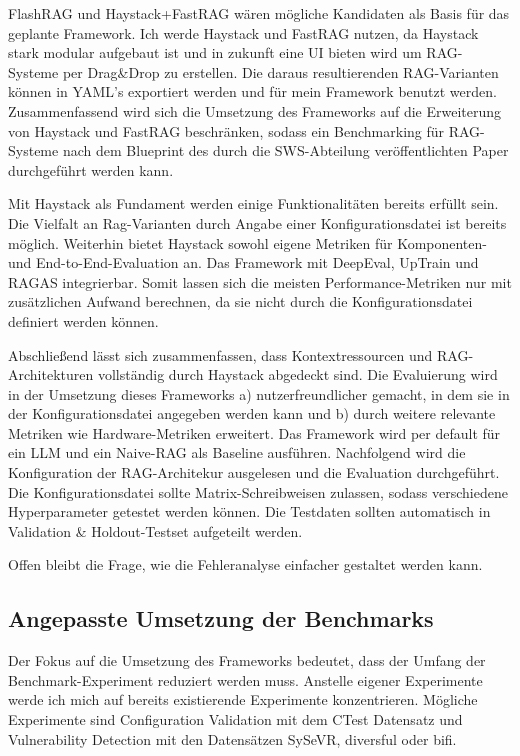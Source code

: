 \documentclass[letterpaper, 10 pt, conference]{ieeeconf}
\begin{document}
FlashRAG und Haystack+FastRAG wären mögliche Kandidaten als Basis für das geplante Framework. 
Ich werde Haystack und FastRAG nutzen, da Haystack stark modular aufgebaut ist und in zukunft eine UI bieten wird um RAG-Systeme per Drag\&Drop zu erstellen. 
Die daraus resultierenden RAG-Varianten können in YAML's exportiert werden und für mein Framework benutzt werden.\\

Zusammenfassend wird sich die Umsetzung des Frameworks auf die Erweiterung von Haystack und FastRAG beschränken, sodass ein Benchmarking für RAG-Systeme nach dem Blueprint des durch die SWS-Abteilung veröffentlichten Paper durchgeführt werden kann.

Mit Haystack als Fundament werden einige Funktionalitäten bereits erfüllt sein. Die Vielfalt an Rag-Varianten durch Angabe einer Konfigurationsdatei ist bereits möglich.
Weiterhin bietet Haystack sowohl eigene Metriken für Komponenten- und End-to-End-Evaluation an. 
Das Framework mit DeepEval, UpTrain und RAGAS integrierbar. Somit lassen sich die meisten Performance-Metriken nur mit zusätzlichen Aufwand berechnen, da sie nicht durch die Konfigurationsdatei definiert werden können.

Abschließend lässt sich zusammenfassen, dass Kontextressourcen und RAG-Architekturen vollständig durch Haystack abgedeckt sind. 
Die Evaluierung wird in der Umsetzung dieses Frameworks a) nutzerfreundlicher gemacht, in dem sie in der Konfigurationsdatei angegeben werden kann und b) durch weitere relevante Metriken wie Hardware-Metriken erweitert.
Das Framework wird per default für ein LLM und ein Naive-RAG als Baseline ausführen. Nachfolgend wird die Konfiguration der RAG-Architekur ausgelesen und die Evaluation durchgeführt.
Die Konfigurationsdatei sollte Matrix-Schreibweisen zulassen, sodass verschiedene Hyperparameter getestet werden können. 
Die Testdaten sollten automatisch in Validation \& Holdout-Testset aufgeteilt werden.

Offen bleibt die Frage, wie die Fehleranalyse einfacher gestaltet werden kann.

\subsection{Angepasste Umsetzung der Benchmarks}
Der Fokus auf die Umsetzung des Frameworks bedeutet, dass der Umfang der Benchmark-Experiment reduziert werden muss. Anstelle eigener Experimente werde ich mich auf bereits existierende Experimente konzentrieren.
Mögliche Experimente sind Configuration Validation mit dem CTest Datensatz und Vulnerability Detection mit den Datensätzen SySeVR, diversful oder bifi.




\end{document}
